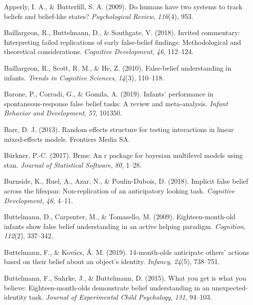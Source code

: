 \documentclass[
  man,floatsintext]{apa6}
\newlength{\cslhangindent}
\newenvironment{CSLReferences}[2] %
 {\begin{list}{}{%
  \setlength{\itemindent}{0pt}
  \setlength{\leftmargin}{0pt}
  \setlength{\parsep}{0pt}
  \ifodd #1
   \setlength{\leftmargin}{\cslhangindent}
   \setlength{\itemindent}{-1\cslhangindent}
  \fi
  \setlength{\itemsep}{#2\baselineskip}}}
 {\end{list}}
\begin{document}
\label{refs}
\begin{CSLReferences}{1}{0}
Apperly, I. A., \& Butterfill, S. A. (2009). Do humans have two systems to track beliefs and belief-like states? \emph{Psychological Review}, \emph{116}(4), 953.

Baillargeon, R., Buttelmann, D., \& Southgate, V. (2018). Invited commentary: Interpreting failed replications of early false-belief findings: Methodological and theoretical considerations. \emph{Cognitive Development}, \emph{46}, 112--124.

Baillargeon, R., Scott, R. M., \& He, Z. (2010). False-belief understanding in infants. \emph{Trends in Cognitive Sciences}, \emph{14}(3), 110--118.

Barone, P., Corradi, G., \& Gomila, A. (2019). Infants' performance in spontaneous-response false belief tasks: A review and meta-analysis. \emph{Infant Behavior and Development}, \emph{57}, 101350.

Barr, D. J. (2013). Random effects structure for testing interactions in linear mixed-effects models. Frontiers Media SA.

Bürkner, P.-C. (2017). Brms: An r package for bayesian multilevel models using stan. \emph{Journal of Statistical Software}, \emph{80}, 1--28.

Burnside, K., Ruel, A., Azar, N., \& Poulin-Dubois, D. (2018). Implicit false belief across the lifespan: Non-replication of an anticipatory looking task. \emph{Cognitive Development}, \emph{46}, 4--11.

Buttelmann, D., Carpenter, M., \& Tomasello, M. (2009). Eighteen-month-old infants show false belief understanding in an active helping paradigm. \emph{Cognition}, \emph{112}(2), 337--342.

Buttelmann, F., \& Kovács, Á. M. (2019). 14-month-olds anticipate others' actions based on their belief about an object's identity. \emph{Infancy}, \emph{24}(5), 738--751.

Buttelmann, F., Suhrke, J., \& Buttelmann, D. (2015). What you get is what you believe: Eighteen-month-olds demonstrate belief understanding in an unexpected-identity task. \emph{Journal of Experimental Child Psychology}, \emph{131}, 94--103.


\end{CSLReferences}
\end{document}
